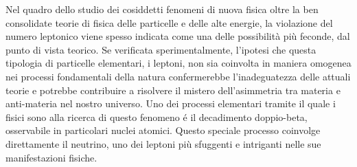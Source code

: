 
Nel quadro dello studio dei cosiddetti fenomeni di nuova fisica oltre la ben consolidate
teorie di fisica delle particelle e delle alte energie, la violazione del numero leptonico
viene spesso indicata come una delle possibilit\`a pi\`u feconde, dal punto di vista
teorico. Se verificata sperimentalmente, l'ipotesi che questa tipologia di particelle
elementari, i leptoni, non sia coinvolta in maniera omogenea nei processi fondamentali della
natura confermerebbe l'inadeguatezza delle attuali teorie e potrebbe contribuire a
risolvere il mistero dell'asimmetria tra materia e anti-materia nel nostro universo. Uno
dei processi elementari tramite il quale i fisici sono alla ricerca di questo fenomeno \'e il
decadimento doppio-beta, osservabile in particolari nuclei atomici. Questo speciale
processo coinvolge direttamente il neutrino, uno dei leptoni pi\`u sfuggenti e intriganti
nelle sue manifestazioni fisiche. 

